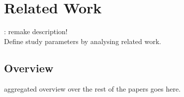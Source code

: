 \chapter{Related Work}
\todo: remake description! \\
Define study parameters by analysing related work.

\section{Overview}
aggregated overview over the rest of the papers goes here.



